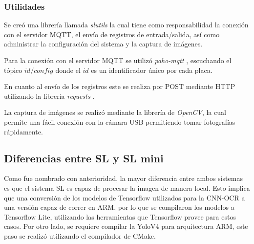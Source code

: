 \subsubsection*{Utilidades}

Se creó una librería llamada \textit{slutils} la cual tiene como responsabilidad la conexión con el servidor MQTT, el envío de registros de entrada/salida, así como administrar la configuración del sistema y la captura de imágenes.

Para la conexión con el servidor MQTT se utilizó \textit{paho-mqtt} \cite{craggs_documentacion_nodate}, escuchando el tópico \textit{$id/config$} donde el $id$ es un identificador único por cada placa.

En cuanto al envío de los registros este se realiza por POST mediante HTTP utilizando la librería \textit{requests} \cite{python_software_foundation_documentacion_nodate}.

La captura de imágenes se realizó mediante la librería de \textit{OpenCV}, la cual permite una fácil conexión con la cámara USB permitiendo tomar fotografías rápidamente.

\subsection{Diferencias entre SL y SL mini}

Como fue nombrado con anterioridad, la mayor diferencia entre ambos sistemas es que el sistema SL es capaz de procesar la imagen de manera local. Esto implica que una conversión de los modelos de Tensorflow \cite{google_tensorflow_nodate} utilizados para la CNN-OCR a una versión capaz de correr en ARM, por lo que se compilaron los modelos a Tensorflow Lite, utilizando las herramientas que Tensorflow provee para estos casos. Por otro lado, se requiere compilar la YoloV4 para arquitectura ARM, este paso se realizó utilizando el compilador de CMake.


